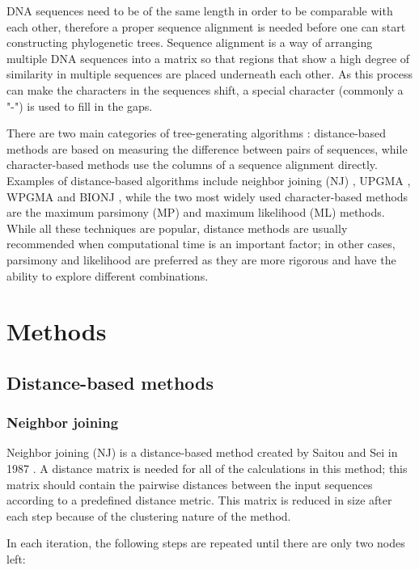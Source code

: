 \documentclass[11pt,twocolumn]{article}
\begin{document}
DNA sequences need to be of the same length in order to be comparable with each other, therefore a proper sequence alignment is needed before one can start constructing phylogenetic trees. Sequence alignment is a way of arranging multiple DNA sequences into a matrix so that regions that show a high degree of similarity in multiple sequences are placed underneath each other. As this process can make the characters in the sequences shift, a special character (commonly a "-") is used to fill in the gaps.

There are two main categories of tree-generating algorithms \cite{DeBruyn2013}: distance-based methods are based on measuring the difference between pairs of sequences, while character-based methods use the columns of a sequence alignment directly. Examples of distance-based algorithms include neighbor joining (NJ) \cite{1987}, UPGMA \cite{sokal58}, WPGMA \cite{sokal58} and BIONJ \cite{Gascuel1997}, while the two most widely used character-based methods are the maximum parsimony (MP) and maximum likelihood (ML) methods. While all these techniques are popular, distance methods are usually recommended when computational time is an important factor; in other cases, parsimony and likelihood are preferred as they are more rigorous and have the ability to explore different combinations.

\section{Methods}

\subsection{Distance-based methods}

\subsubsection{Neighbor joining}

Neighbor joining (NJ) is a distance-based method created by Saitou and Sei in 1987 \cite{1987}. A distance matrix is needed for all of the calculations in this method; this matrix should contain the pairwise distances between the input sequences according to a predefined distance metric. This matrix is reduced in size after each step because of the clustering nature of the method.

In each iteration, the following steps are repeated until there are only two nodes left:
\end{document}
